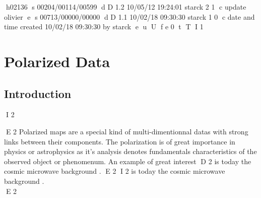 h02136
s 00204/00114/00599
d D 1.2 10/05/12 19:24:01 starck 2 1
c update olivier
e
s 00713/00000/00000
d D 1.1 10/02/18 09:30:30 starck 1 0
c date and time created 10/02/18 09:30:30 by starck
e
u
U
f e 0
t
T
I 1


\chapter{Polarized Data}
\label{ch_intro_pola}

\section{Introduction}
I 2

E 2
Polarized maps are a special kind of multi-dimentionnal datas with strong links between their components. The polarization is of great importance 
in physics or astrophysics as it's analysis denotes fundamentals characteristics of the observed object or phenomenum. An example of great interest 
D 2
is today the cosmic microwave background \citep{starck}.
E 2
I 2
is today the cosmic microwave background \citep{zalda,dasi}.\\
E 2

